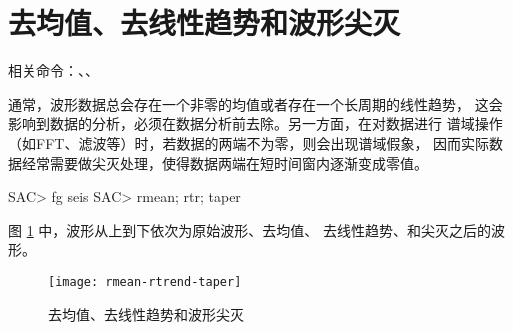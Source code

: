 \section{去均值、去线性趋势和波形尖灭}
相关命令：、、

通常，波形数据总会存在一个非零的均值或者存在一个长周期的线性趋势，
这会影响到数据的分析，必须在数据分析前去除。另一方面，在对数据进行
谱域操作（如FFT、滤波等）时，若数据的两端不为零，则会出现谱域假象，
因而实际数据经常需要做尖灭处理，使得数据两端在短时间窗内逐渐变成零值。

\begin{SACCode}
SAC> fg seis
SAC> rmean; rtr; taper
\end{SACCode}

图 \ref{fig:rmean-rtrend-taper} 中，波形从上到下依次为原始波形、去均值、
去线性趋势、和尖灭之后的波形。

\begin{figure}[H]
\centering
\texttt{[image: rmean-rtrend-taper]}
\caption{去均值、去线性趋势和波形尖灭}
\label{fig:rmean-rtrend-taper}
\end{figure}
